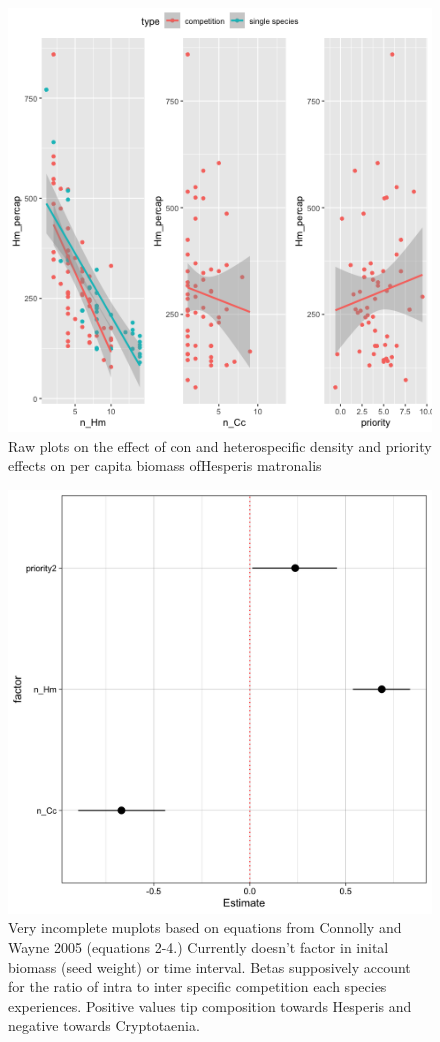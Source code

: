 \documentclass[11pt]{article}\usepackage[]{graphicx}\usepackage[]{color}
\begin{document}
\begin{figure}[h!]
    \centering
\includegraphics[width=\textwidth]{..//figure/hesp_plots.png}
    \caption{Raw plots on the effect of con and heterospecific density and priority effects on per capita biomass ofHesperis matronalis } 
    \label{fig:Hm}
\end{figure}

\begin{figure}[h!]
    \centering
\includegraphics[width=\textwidth]{..//figure/RGRD_muplot.png}
    \caption{Very incomplete muplots based on equations from Connolly and Wayne 2005 (equations 2-4.) Currently doesn't factor in inital biomass (seed weight) or time interval. Betas supposively account for the ratio of intra to inter specific competition each species experiences. Positive values tip composition towards Hesperis and negative towards Cryptotaenia. } 
    \label{fig:Con}
\end{figure}
\end{document}

